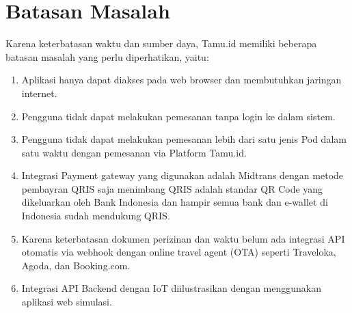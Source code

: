 \section{Batasan Masalah}
Karena keterbatasan waktu dan sumber daya, Tamu.id memiliki beberapa batasan masalah yang perlu diperhatikan, yaitu:
\begin{enumerate}
    \item Aplikasi hanya dapat diakses pada web browser dan membutuhkan jaringan internet.
    \item Pengguna tidak dapat melakukan pemesanan tanpa login ke dalam sistem.
    \item Pengguna tidak dapat melakukan pemesanan lebih dari satu jenis Pod dalam satu waktu dengan pemesanan via Platform Tamu.id.
    \item Integrasi Payment gateway yang digunakan adalah Midtrans dengan metode pembayran QRIS saja menimbang QRIS adalah standar QR Code yang dikeluarkan oleh Bank Indonesia dan hampir semua bank dan e-wallet di Indonesia sudah mendukung QRIS.
    \item Karena keterbatasan dokumen perizinan dan waktu belum ada integrasi API otomatis via webhook dengan online travel agent (OTA) seperti Traveloka, Agoda, dan Booking.com.
    \item Integrasi API Backend dengan IoT diilustrasikan dengan menggunakan aplikasi web simulasi.
\end{enumerate}